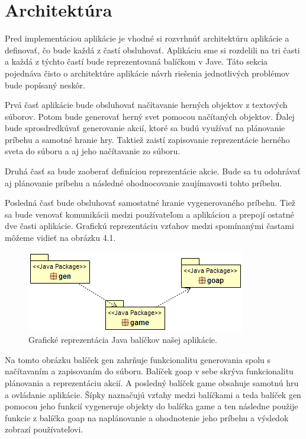 \section{Architektúra}
Pred implementáciou aplikácie je vhodné si rozvrhnúť architektúru aplikácie a definovať, čo bude každá z častí obsluhovať. Aplikáciu sme si rozdelili na tri časti a každá z týchto častí bude reprezentovaná balíčkom v Jave. Táto sekcia pojednáva čisto o architektúre aplikácie návrh riešenia jednotlivých problémov bude popísaný neskôr.\par
Prvá časť aplikácie bude obsluhovať načítavanie herných objektov z textových súborov. Potom bude generovať herný svet pomocou načítaných objektov. Ďalej bude sprosdredkúvať generovanie akcií, ktoré sa budú využívať na plánovanie príbehu a samotné hranie hry. Taktiež zaistí zapisovanie reprezentácie herného sveta do súboru a aj jeho načítavanie zo súboru.\par
Druhá časť sa bude zaoberať definíciou reprezentácie akcie. Bude sa tu odohrávať aj plánovanie príbehu a následné ohodnocovanie zaujímavosti tohto príbehu.\par
Posledná časť bude obsluhovať samostatné hranie vygenerovaného príbehu. Tiež sa bude venovať komunikácii medzi používateľom a aplikáciou a prepojí ostatné dve časti aplikácie. Grafickú reprezentáciu vzťahov medzi spomínanými častami môžeme vidieť na obrázku 4.1.
\begin{figure}[H] 
\begin{center}
\includegraphics[scale=1.0]{img/packages.png}
\caption{Grafické reprezentácia Java balíčkov našej aplikácie.}
\label{fig:ch41}
\end{center}
\end{figure}
Na tomto obrázku balíček gen zahrňuje funkcionalitu generovania spolu s načítavaním a zapisovaním do súboru. Balíček goap v sebe skrýva funkcionalitu plánovania a reprezentáciu akcií. A posledný balíček game obsahuje samotnú hru a ovládanie aplikácie. Šípky naznačujú vzťahy medzi balíčkami a teda balíček gen pomocou jeho funkcií vygeneruje objekty do balíčka game a ten následne použije funkcie z balíčka goap na naplánovanie a ohodnotenie jeho príbehu a výsledok zobrazí používateľovi.
